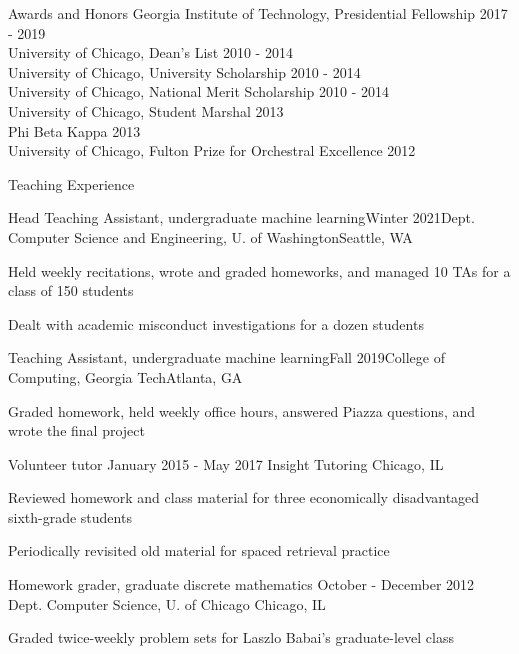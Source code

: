 \documentclass{resume} %
\begin{document}
\begin{rSection}{Awards and Honors}
Georgia Institute of Technology, Presidential Fellowship \hfill 2017 - 2019 \\
University of Chicago, Dean's List \hfill 2010 - 2014 \\
University of Chicago, University Scholarship \hfill 2010 - 2014 \\
University of Chicago, National Merit Scholarship \hfill 2010 - 2014 \\
University of Chicago, Student Marshal \hfill 2013 \\
Phi Beta Kappa \hfill 2013 \\
University of Chicago, Fulton Prize for Orchestral Excellence \hfill 2012
\end{rSection}

\begin{rSection}{Teaching Experience}

\begin{rSubsection}{Head Teaching Assistant, undergraduate machine learning}{Winter 2021}{Dept. Computer Science and Engineering, U. of Washington}{Seattle, WA}
\item Held weekly recitations, wrote and graded homeworks, and managed 10 TAs for a class of 150 students
\item Dealt with academic misconduct investigations for a dozen students
\end{rSubsection}

\begin{rSubsection}{Teaching Assistant, undergraduate machine learning}{Fall 2019}{College of Computing, Georgia Tech}{Atlanta, GA}
\item Graded homework, held weekly office hours, answered Piazza questions, and wrote the final project
\end{rSubsection}

\begin{rSubsection}{Volunteer tutor}{ January 2015 - May 2017}{ Insight Tutoring}{ Chicago, IL}
\item Reviewed homework and class material for three economically disadvantaged sixth-grade students
\item Periodically revisited old material for spaced retrieval practice
\end{rSubsection}

\begin{rSubsection}{Homework grader, graduate discrete mathematics}{ October - December 2012}{ Dept. Computer Science, U. of Chicago}{ Chicago, IL}
\item Graded twice-weekly problem sets for Laszlo Babai's graduate-level class
\end{rSubsection}


\end{rSection}
\end{document}
